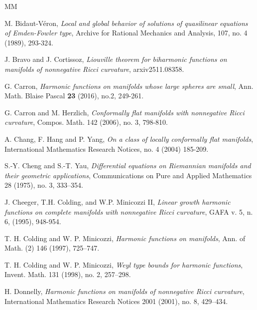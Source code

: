 \documentclass[12pt]{amsart}
\theoremstyle{plain}
\theoremstyle{definition}
\theoremstyle{remark}     %
\numberwithin{equation}{section}
\begin{document}
\begin{thebibliography}{MM}



M. Bidaut-V{\'e}ron, 
\emph{Local and global behavior of solutions of quasilinear equations of Emden-Fowler type},
Archive for Rational Mechanics and Analysis, 107, no. 4 (1989), 293-324.

J. Bravo and J.  Cortissoz, 
\emph{Liouville theorem for biharmonic functions on manifolds of nonnegative Ricci curvature}, arxiv2511.08358.

G. Carron,
\emph{Harmonic functions on manifolds whose large spheres are small},
Ann. Math. Blaise Pascal \textbf{23} (2016), no.2, 249-261.

G. Carron and M. Herzlich,
\textit{Conformally flat manifolds with nonnegative Ricci curvature},
Compos. Math. 142 (2006), no. 3, 798-810.

A. Chang, F. Hang and P. Yang, 
\emph{On a class of locally conformally flat manifolds},
International Mathematics Research Notices, no. 4 (2004) 185-209.


 S.-Y. Cheng and S.-T. Yau, \emph{Differential equations on Riemannian manifolds and their geometric applications}, Communications on Pure and Applied Mathematics 28 (1975), no. 3, 333–354.

 J. Cheeger, T.H. Colding, and W.P. Minicozzi II, \emph{Linear growth harmonic functions
on complete manifolds with nonnegative Ricci curvature}, GAFA v. 5, n. 6, (1995), 948-954. 

 T. H. Colding and W. P. Minicozzi, \emph{Harmonic functions on manifolds}, Ann. of Math. (2) 146 (1997), 725–747. 

 T. H. Colding and W. P. Minicozzi, \emph{Weyl type bounds for harmonic functions},
Invent. Math. 131 (1998), no. 2, 257–298.

 H. Donnelly, \emph{Harmonic functions on manifolds of nonnegative Ricci curvature}, International Mathematics Research Notices 2001 (2001), no. 8, 429–434.



\end{thebibliography}
\end{document}
